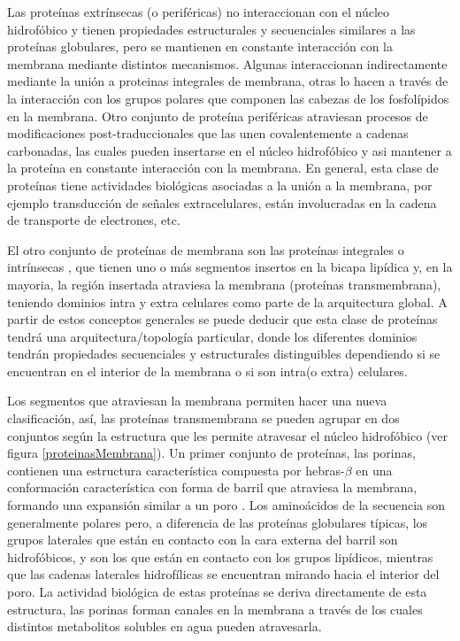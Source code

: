 Las proteínas extrínsecas (o periféricas) no interaccionan con el núcleo hidrofóbico y tienen propiedades estructurales y secuenciales similares a las proteínas globulares, 
pero se mantienen en constante interacción con la membrana mediante distintos mecanismos.
Algunas interaccionan indirectamente mediante la unión a proteinas integrales de membrana, otras lo hacen a través de la interacción con los grupos polares que componen las cabezas de los fosfolípidos en la membrana. 
Otro conjunto de proteína periféricas atraviesan procesos de modificaciones post-traduccionales que las unen covalentemente a cadenas carbonadas, las cuales pueden insertarse en el núcleo hidrofóbico y
asi mantener a la proteína en constante interacción con la membrana.
En general, esta clase de proteínas tiene actividades biológicas asociadas a la unión a la membrana, por ejemplo transducción de señales extracelulares, están involucradas en la cadena de transporte de electrones, etc.

El otro conjunto de proteínas de membrana son las proteínas integrales o intrínsecas \cite{heijne1994membrane}, que tienen uno o más segmentos insertos en la bicapa lipídica y, en la mayoria, 
la región insertada atraviesa la membrana (proteínas transmembrana), teniendo dominios intra y extra celulares como parte de la arquitectura global.
A partir de estos conceptos generales se puede deducir que esta clase de proteínas tendrá una arquitectura/topología particular, 
donde los diferentes dominios tendrán propiedades secuenciales y estructurales distinguibles dependiendo si se encuentran en el interior de la membrana o si son intra(o extra) celulares. 

Los segmentos que atraviesan la membrana permiten hacer una nueva clasificación, así, las proteínas transmembrana se pueden agrupar 
en dos conjuntos según la estructura que les permite atravesar el núcleo hidrofóbico (ver figura \ref{proteinasMembrana}).
Un primer conjunto de proteínas, las porinas, contienen una estructura característica compuesta por hebras-$\beta$ en una conformación característica con forma de barril que atraviesa la membrana, formando una expansión similar a un poro \cite{weiss1991molecular}.
Los aminoácidos de la secuencia son generalmente polares pero, a diferencia de las proteínas globulares típicas, los grupos laterales que están en contacto con la cara externa del barril son hidrofóbicos, y son los que están en contacto con 
los grupos lipídicos, mientras que las cadenas laterales hidrofílicas se encuentran mirando hacia el interior del poro.
La actividad biológica de estas proteínas se deriva directamente de esta estructura, las porinas forman canales en la membrana a través de los cuales distintos metabolitos solubles en agua pueden atravesarla. 

